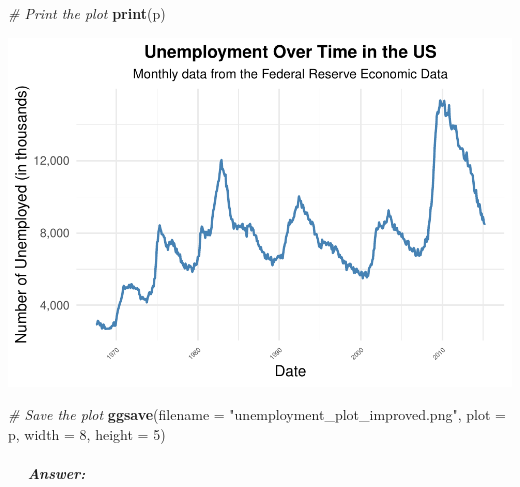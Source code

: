 \documentclass[
]{article}
\newenvironment{Shaded}{\begin{snugshade}}{\end{snugshade}}
\newcommand{\AttributeTok}[1]{\textcolor[rgb]{0.13,0.29,0.53}{#1}}
\newcommand{\CommentTok}[1]{\textcolor[rgb]{0.56,0.35,0.01}{\textit{#1}}}
\newcommand{\DecValTok}[1]{\textcolor[rgb]{0.00,0.00,0.81}{#1}}
\newcommand{\FunctionTok}[1]{\textcolor[rgb]{0.13,0.29,0.53}{\textbf{#1}}}
\newcommand{\NormalTok}[1]{#1}
\newcommand{\StringTok}[1]{\textcolor[rgb]{0.31,0.60,0.02}{#1}}
\begin{document}
\begin{Shaded}
\begin{Highlighting}[]
\CommentTok{\# Print the plot}
\FunctionTok{print}\NormalTok{(p)}
\end{Highlighting}
\end{Shaded}

\begin{center}\includegraphics{P1_exercises_files/figure-latex/answer 6.1-1} \end{center}

\begin{Shaded}
\begin{Highlighting}[]
\CommentTok{\# Save the plot}
\FunctionTok{ggsave}\NormalTok{(}\AttributeTok{filename =} \StringTok{"unemployment\_plot\_improved.png"}\NormalTok{, }\AttributeTok{plot =}\NormalTok{ p, }\AttributeTok{width =} \DecValTok{8}\NormalTok{, }\AttributeTok{height =} \DecValTok{5}\NormalTok{)}
\end{Highlighting}
\end{Shaded}

\subparagraph{  Answer:}\label{answer-10}

 
\end{document}
